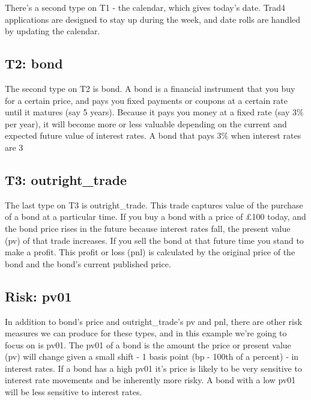 \documentclass{report}
\begin{document}
There's a second type on T1 - the calendar, which gives today's date. Trad4 applications are designed to stay up during the week, and date rolls are handled by updating the calendar.

\subsection{T2: bond}

The second type on T2 is bond. A bond is a financial instrument that you buy for a certain price, and pays you fixed payments or coupons at a certain rate until it matures (say 5 years). Because it pays you money at a fixed rate (say 3\% per year), it will become more or less valuable depending on the current and expected future value of interest rates. A bond that pays 3\% when interest rates are 3%

\subsection{T3: outright_trade}

The last type on T3 is outright_trade. This trade captures value of the purchase of a bond at a particular time. If you buy a bond with a price of £100 today, and the bond price rises in the future because interest rates fall, the present value (pv) of that trade increases. If you sell the bond at that future time you stand to make a profit. This profit or loss (pnl) is calculated by the original price of the bond and the bond's current published price.

\subsection{Risk: pv01}

In addition to bond's price and outright_trade's pv and pnl, there are other risk measures we can produce for these types, and in this example we're going to focus on is pv01. The pv01 of a bond is the amount the price or present value (pv) will change given a small shift - 1 basis point (bp - 100th of a percent) - in interest rates. If a bond has a high pv01 it's price is likely to be very sensitive to interest rate movements and be inherently more risky. A bond with a low pv01 will be less sensitive to interest rates. 
\end{document}
